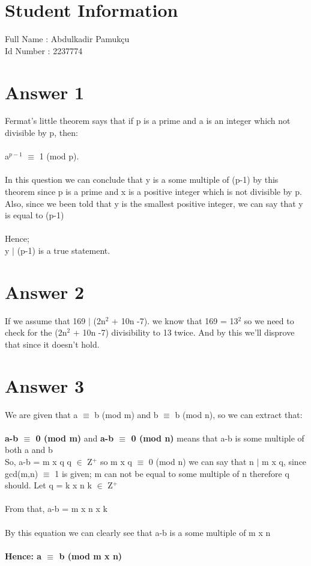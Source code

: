 \documentclass[12pt]{article}
\begin{document}
\section*{Student Information } 
Full Name :  Abdulkadir Pamukçu\\
Id Number :  2237774\\

\section*{Answer 1}

Fermat's little theorem says that if p is a prime and a is an integer which not divisible by p, then: \\
\\
a$^{p-1}$ $\equiv$ 1 (mod p).\\
\\
In this question we can conclude that y is a some multiple of (p-1) by this theorem since p is a prime and x is a positive integer which is not divisible by p. Also, since we been told that y is the smallest positive integer, we can say that y is equal to (p-1)\\
\\
Hence; \\
y $|$ (p-1) is a true statement.

\section*{Answer 2}

If we assume that 169 $|$ (2n$^2$ + 10n -7). we know that 169 = 13$^2$ so we need to check for the (2n$^2$ + 10n -7) divisibility to 13 twice. And by this we'll disprove that since it doesn't hold.

\section*{Answer 3}

We are given that a $\equiv$ b (mod m) and b $\equiv$ b (mod n), so we can extract that: \\
\\
\textbf{a-b $\equiv$ 0 (mod m)} and \textbf{a-b $\equiv$ 0 (mod n)} means that a-b is some multiple of both a and b \\
So, a-b = m x q q $\in$ Z$^+$ so m x q $\equiv$ 0 (mod n) we can say that n $|$ m x q, since gcd(m,n) $\equiv$ 1 is given; m can not be equal to some multiple of n therefore q should. Let  q = k x n k $\in$ Z$^+$ \\
\\
From that, a-b = m x n x k\\
\\
By this equation we can clearly see that a-b is a some multiple of m x n\\
\\
\textbf{Hence: a $\equiv$ b  (mod m x n)}
\end{document}
